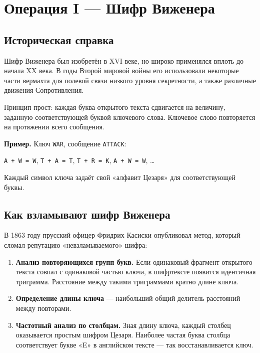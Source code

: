 \documentclass[12pt, a4paper]{article}
\makeatletter
\newenvironment{factbox}{%
  \vspace{4pt}\begin{lrbox}{\@tempboxa}\begin{minipage}{0.93\textwidth}%
  \setlength{\parskip}{5pt}\small
}{%
  \end{minipage}\end{lrbox}%
  \fcolorbox{amber}{blockbg}{\usebox{\@tempboxa}}\vspace{4pt}
}
\makeatother
\begin{document}
\section{Операция I — Шифр Виженера}

\subsection{Историческая справка}

Шифр Виженера был изобретён в XVI веке, но широко применялся вплоть до начала
XX века. В годы Второй мировой войны его использовали некоторые части вермахта
для полевой связи низкого уровня секретности, а также различные движения
Сопротивления.

Принцип прост: каждая буква открытого текста сдвигается на величину, заданную
соответствующей буквой ключевого слова. Ключевое слово повторяется на протяжении
всего сообщения.

\begin{factbox}
\textbf{Пример.} Ключ \texttt{WAR}, сообщение \texttt{ATTACK}:

\texttt{A + W = W}, \texttt{T + A = T}, \texttt{T + R = K}, \texttt{A + W = W}, \ldots

Каждый символ ключа задаёт свой «алфавит Цезаря» для соответствующей буквы.
\end{factbox}

\subsection{Как взламывают шифр Виженера}

В 1863 году прусский офицер Фридрих Касиски опубликовал метод, который сломал
репутацию «невзламываемого» шифра:

\begin{enumerate}[leftmargin=1.5cm]
  \item \textbf{Анализ повторяющихся групп букв.} Если одинаковый фрагмент
        открытого текста совпал с одинаковой частью ключа, в шифртексте
        появится идентичная триграмма. Расстояние между такими триграммами
        кратно длине ключа.
  \item \textbf{Определение длины ключа} — наибольший общий делитель
        расстояний между повторами.
  \item \textbf{Частотный анализ по столбцам.} Зная длину ключа, каждый столбец
        оказывается простым шифром Цезаря. Наиболее частая буква столбца
        соответствует букве «E» в английском тексте — так восстанавливается
        ключ.
\end{enumerate}
\end{document}
